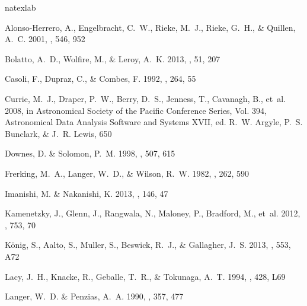 \begin{thebibliography}{28}
\expandafter\ifx\csname natexlab\endcsname\relax\def\natexlab#1{#1}\fi

{Alonso-Herrero}, A., {Engelbracht}, C.~W., {Rieke}, M.~J., {Rieke}, G.~H., \&
  {Quillen}, A.~C. 2001, \apj, 546, 952

{Bolatto}, A.~D., {Wolfire}, M., \& {Leroy}, A.~K. 2013, \araa, 51, 207

{Casoli}, F., {Dupraz}, C., \& {Combes}, F. 1992, \aap, 264, 55

{Currie}, M.~J., {Draper}, P.~W., {Berry}, D.~S., {Jenness}, T., {Cavanagh},
  B., {et~al.} 2008, in Astronomical Society of the Pacific Conference Series,
  Vol. 394, Astronomical Data Analysis Software and Systems XVII, ed. R.~W.
  {Argyle}, P.~S. {Bunclark}, \& J.~R. {Lewis}, 650

{Downes}, D. \& {Solomon}, P.~M. 1998, \apj, 507, 615

{Frerking}, M.~A., {Langer}, W.~D., \& {Wilson}, R.~W. 1982, \apj, 262, 590

{Imanishi}, M. \& {Nakanishi}, K. 2013, \aj, 146, 47

{Kamenetzky}, J., {Glenn}, J., {Rangwala}, N., {Maloney}, P., {Bradford}, M.,
  {et~al.} 2012, \apj, 753, 70

{K{\"o}nig}, S., {Aalto}, S., {Muller}, S., {Beswick}, R.~J., \& {Gallagher},
  J.~S. 2013, \aap, 553, A72

{Lacy}, J.~H., {Knacke}, R., {Geballe}, T.~R., \& {Tokunaga}, A.~T. 1994,
  \apjl, 428, L69

{Langer}, W.~D. \& {Penzias}, A.~A. 1990, \apj, 357, 477


\end{thebibliography}
